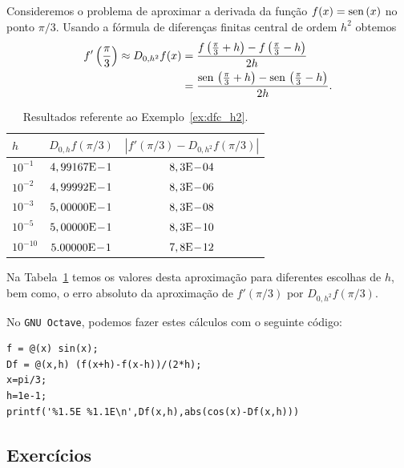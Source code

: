 \begin{ex}\label{ex:dfc_h2}
  Consideremos o problema de aproximar a derivada da função $f(x) = \operatorname{sen}\,(x)$ no ponto $\pi/3$. Usando a fórmula de diferenças finitas central de ordem $h^2$ obtemos
  \begin{align}
    f'\left(\frac{\pi}{3}\right) \approx D_{0,h^2}f(x) &= \frac{f\left(\frac{\pi}{3}+h\right)-f\left(\frac{\pi}{3}-h\right)}{2h}\\
          &= \frac{\operatorname{sen}\,\left(\frac{\pi}{3}+h\right)-\operatorname{sen}\,\left(\frac{\pi}{3}-h\right)}{2h}. 
  \end{align}

\begin{table}[h!]
  \centering
  \caption{Resultados referente ao Exemplo~\ref{ex:dfc_h2}.}
  \begin{tabular}{l|c|c}
    $h$ & $D_{0,h}f(\pi/3)$ & $|f'(\pi/3)-D_{0,h^2}f(\pi/3)|$\\ \hline
    $10^{-1}$ & $4,99167\mathrm{E}\!-\!1$ & $8,3\mathrm{E}\!-\!04$ \\
    $10^{-2}$ & $4,99992\mathrm{E}\!-\!1$ & $8,3\mathrm{E}\!-\!06$ \\
    $10^{-3}$ & $5,00000\mathrm{E}\!-\!1$ & $8,3\mathrm{E}\!-\!08$ \\
    $10^{-5}$ & $5,00000\mathrm{E}\!-\!1$ & $8,3\mathrm{E}\!-\!10$ \\
    $10^{-10}$ & $5.00000\mathrm{E}\!-\!1$ & $7,8\mathrm{E}\!-\!12$ \\\hline
  \end{tabular}
  \label{tab:ex_dfc_h2}
\end{table}

Na Tabela~\ref{tab:ex_dfc_h2} temos os valores desta aproximação para diferentes escolhas de $h$, bem como, o erro absoluto da aproximação de $f'(\pi/3)$ por $D_{0,h^2}f(\pi/3)$.

No \verb+GNU Octave+, podemos fazer estes cálculos com o seguinte código:
\begin{verbatim}
f = @(x) sin(x);
Df = @(x,h) (f(x+h)-f(x-h))/(2*h);
x=pi/3;
h=1e-1;
printf('%1.5E %1.1E\n',Df(x,h),abs(cos(x)-Df(x,h)))
\end{verbatim}
\end{ex}


\subsection*{Exercícios}

